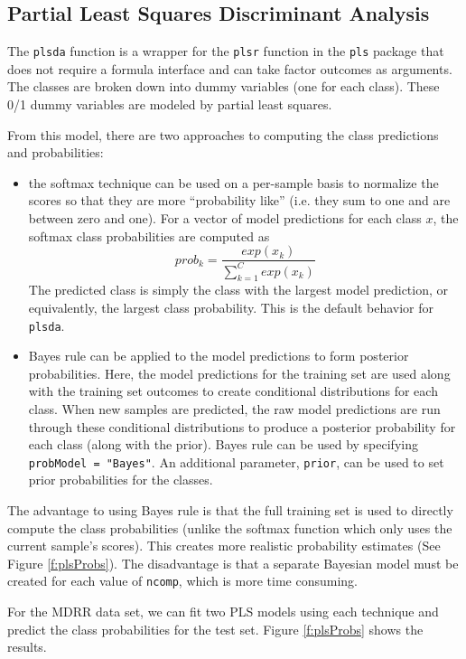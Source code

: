 \documentclass[12pt]{article}
\begin{document}
\subsection{Partial Least Squares Discriminant Analysis}

The \texttt{plsda} function is a wrapper for the \texttt{plsr} function in the \texttt{pls} package that does not require a formula interface and can take factor outcomes as arguments. The classes are broken down into dummy variables (one for each class). These 0/1 dummy variables are modeled by partial least squares. 

From this model, there are two approaches to computing the class predictions and probabilities:
\begin{itemize}
\item the softmax technique can be used on a per-sample basis to normalize the scores so that they are more ``probability like'' (i.e. they sum to one and are between zero and one). For a vector of model predictions for each class $x$, the softmax class probabilities are computed as
\[
prob_k= \frac{exp(x_k)}{\sum_{k=1}^C exp(x_k)}
\]
The predicted class is simply the class with the largest model prediction, or equivalently, the largest class probability. This is the default behavior for \texttt{plsda}.
\item Bayes rule can be applied to the model predictions to form posterior probabilities. Here, the model predictions for the training set are used along with the training set outcomes to create conditional distributions for each class. When new samples are predicted, the raw model predictions are run through these conditional distributions to produce a posterior probability for each class (along with the prior). Bayes rule can be used by specifying \texttt{probModel = "Bayes"}. An additional parameter, \texttt{prior}, can be used to set prior probabilities  for the classes.
\end{itemize}
The advantage to using Bayes rule is that the full training set is used to directly compute the class probabilities (unlike the softmax function which only uses the current sample's scores). This creates more realistic probability estimates (See Figure \ref{f:plsProbs}). The disadvantage is that a separate Bayesian model must be created for each value of \texttt{ncomp}, which is more time consuming.  
 
For the MDRR data set, we can fit two PLS models using each technique and predict the class probabilities for the test set. Figure \ref{f:plsProbs}  shows the results.
\end{document}
